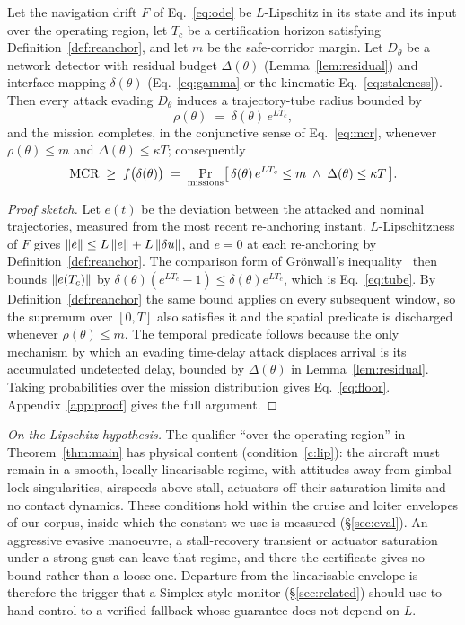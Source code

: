 \begin{theorem}
\label{thm:main}
Let the navigation drift $F$ of Eq.~\eqref{eq:ode} be $L$-Lipschitz in its state
and its input over the operating region, let $T_c$ be a certification horizon satisfying
Definition~\ref{def:reanchor}, and let $m$ be the safe-corridor margin. Let
$D_\theta$ be a network detector with residual budget $\Delta(\theta)$
(Lemma~\ref{lem:residual}) and interface mapping $\delta(\theta)$
(Eq.~\eqref{eq:gamma} or the kinematic Eq.~\eqref{eq:staleness}). Then every attack
evading $D_\theta$ induces a trajectory-tube radius bounded by
\begin{equation}
\label{eq:tube}
\rho(\theta) \;=\; \delta(\theta)\,e^{L T_c},
\end{equation}
and the mission completes, in the conjunctive sense of Eq.~\eqref{eq:mcr},
whenever $\rho(\theta)\le m$ and $\Delta(\theta)\le\kappa T$; consequently
\begin{equation}
\label{eq:floor}
\mathrm{MCR} \;\ge\; f\big(\delta(\theta)\big) \;=\;
\Pr_{\text{missions}}\!\big[\,\delta(\theta)\,e^{LT_c}\le m
\;\wedge\; \Delta(\theta)\le\kappa T\,\big].
\end{equation}
\end{theorem}
\begin{proof}[Proof sketch]
Let $e(t)$ be the deviation between the attacked and nominal trajectories,
measured from the most recent re-anchoring instant. $L$-Lipschitzness of $F$
gives $\left\lVert \dot e\right\rVert\le L\left\lVert e\right\rVert+L\left\lVert \delta u\right\rVert$, and $e=0$ at each
re-anchoring by Definition~\ref{def:reanchor}. The comparison form of
Gr\"onwall's inequality~\cite{gronwall1919} then bounds $\left\lVert e(T_c)\right\rVert$ by
$\delta(\theta)(e^{LT_c}-1)\le\delta(\theta)e^{LT_c}$, which is
Eq.~\eqref{eq:tube}. By
Definition~\ref{def:reanchor} the same bound applies on every subsequent window,
so the supremum over $[0,T]$ also satisfies it and the spatial
predicate is discharged whenever $\rho(\theta)\le m$. The temporal predicate follows because
the only mechanism by which an evading time-delay attack displaces arrival is
its accumulated undetected delay, bounded by $\Delta(\theta)$ in
Lemma~\ref{lem:residual}. Taking probabilities over the mission distribution
gives Eq.~\eqref{eq:floor}. Appendix~\ref{app:proof} gives the full argument.
\end{proof}

\emph{On the Lipschitz hypothesis.} The qualifier ``over the operating region''
in Theorem~\ref{thm:main} has physical content (condition~\ref{c:lip}): the
aircraft must remain in a smooth, locally linearisable regime, with attitudes
away from gimbal-lock singularities, airspeeds above stall, actuators off their
saturation limits and no contact dynamics. These conditions hold within the
cruise and loiter envelopes of our corpus, inside which the constant we use is
measured (\S\ref{sec:eval}). An aggressive evasive manoeuvre, a stall-recovery
transient or actuator saturation under a strong gust can leave that regime, and
there the certificate gives no bound rather than a loose one. Departure from the
linearisable envelope is therefore the trigger that a Simplex-style monitor
(\S\ref{sec:related}) should use to hand control to a verified fallback whose
guarantee does not depend on $L$.

